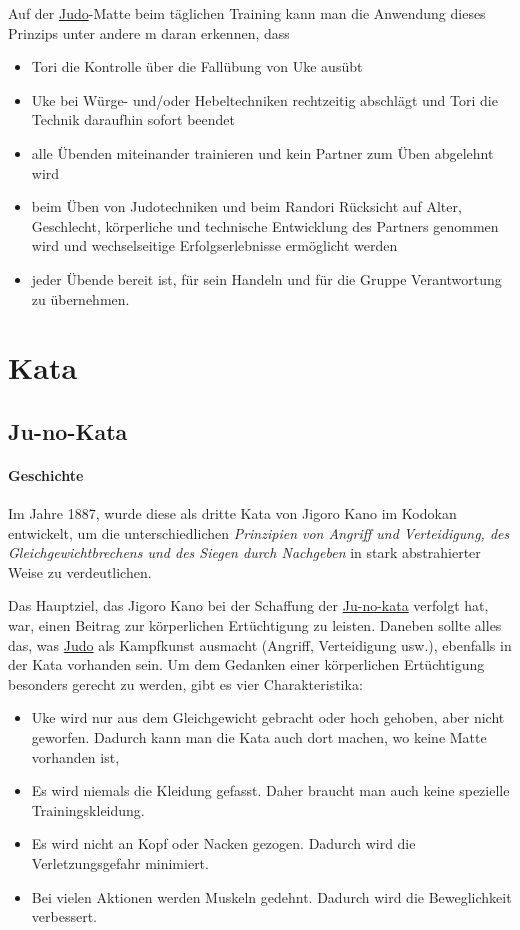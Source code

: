 \documentclass[justified, a4paper, notitlepage, captions=tableheading, nobib]{tufte-handout}
\begin{document}
Auf der \hyperref[org80c3996]{Judo}-Matte beim täglichen Training kann man die Anwendung dieses Prinzips unter andere
m daran erkennen, dass 
\begin{itemize}
\item Tori die Kontrolle über die Fallübung von Uke ausübt
\item Uke bei Würge- und/oder Hebeltechniken rechtzeitig abschlägt und Tori die Technik daraufhin sofort beendet
\item alle Übenden miteinander trainieren und kein Partner zum Üben abgelehnt wird
\item beim Üben von Judotechniken und beim Randori Rücksicht auf Alter, Geschlecht, körperliche und technische  Entwicklung des Partners genommen wird und wechselseitige Erfolgserlebnisse ermöglicht werden
\item jeder Übende bereit ist, für sein Handeln und für die Gruppe Verantwortung zu übernehmen.
\end{itemize}


\newpage
\section{Kata }
\label{sec:org452e93f}
\subsection{\label{org1f25ea6}Ju-no-Kata}
\label{sec:orgc158187}
\paragraph{Geschichte}
\label{sec:orgd8d5a36}
Im Jahre 1887, wurde diese als dritte Kata von Jigoro Kano im Kodokan entwickelt, um die unterschiedlichen \emph{Prinzipien von Angriff und Verteidigung, des Gleichgewichtbrechens und des Siegen durch Nachgeben} in stark abstrahierter Weise zu verdeutlichen. 

Das Hauptziel, das Jigoro Kano bei der Schaffung der \hyperref[org1f25ea6]{Ju-no-kata} verfolgt hat, war, einen Beitrag zur körperlichen Ertüchtigung zu leisten. 
Daneben sollte alles das, was \hyperref[org80c3996]{Judo} als Kampfkunst ausmacht (Angriff, Verteidigung usw.), ebenfalls in der Kata vorhanden sein. 
Um dem Gedanken einer körperlichen Ertüchtigung besonders gerecht zu werden, gibt es vier Charakteristika:

\begin{itemize}
\item Uke wird nur aus dem Gleichgewicht gebracht oder hoch gehoben, aber nicht geworfen. Dadurch kann man die Kata auch dort machen, wo keine Matte vorhanden ist,
\item Es wird niemals die Kleidung gefasst. Daher braucht man auch keine spezielle Trainingskleidung.
\item Es wird nicht an Kopf oder Nacken gezogen. Dadurch wird die Verletzungsgefahr minimiert.
\item Bei vielen Aktionen werden Muskeln gedehnt. Dadurch wird die Beweglichkeit verbessert.
\end{itemize}
\end{document}
